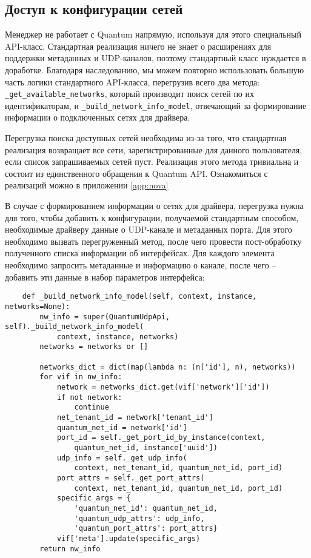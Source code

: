 \subsection{Доступ к конфигурации сетей}

Менеджер не работает с Quantum напрямую, используя для этого специальный
API-класс. Стандартная реализация ничего не знает о расширениях для поддержки метаданных
и UDP-каналов, поэтому стандартный класс нуждается в доработке. Благодаря наследованию,
мы можем повторно использовать большую часть логики стандартного API-класса, перегрузив
всего два метода: \verb`_get_available_networks`,  который производит поиск сетей по их 
идентификаторам, и \verb`_build_network_info_model`, отвечающий за формирование
информации о подключенных сетях для драйвера.

Перегрузка поиска доступных сетей необходима из-за того, что стандартная реализация 
возвращает все сети, зарегистрированные для данного пользователя, если список запрашиваемых
сетей пуст. Реализация этого метода тривиальна и состоит из единственного обращения к 
Quantum API. Ознакомиться с реализаций можно в приложении \ref{app:nova}

В случае с формированием информации о сетях для драйвера, перегрузка нужна для того, чтобы
добавить к конфигурации, получаемой стандартным способом, необходимые драйверу
данные о UDP-канале и метаданных порта. Для этого необходимо вызвать перегруженный метод,
после чего провести пост-обработку полученного списка информации об интерфейсах. 
Для каждого элемента необходимо запросить метаданные и информацию о канале, после чего -- 
добавить эти данные в набор параметров интерфейса:
\begin{lstlisting}
    def _build_network_info_model(self, context, instance, networks=None):
        nw_info = super(QuantumUdpApi, self)._build_network_info_model(
            context, instance, networks)
        networks = networks or []

        networks_dict = dict(map(lambda n: (n['id'], n), networks))
        for vif in nw_info:
            network = networks_dict.get(vif['network']['id'])
            if not network:
                continue
            net_tenant_id = network['tenant_id']
            quantum_net_id = network['id']
            port_id = self._get_port_id_by_instance(context,
                quantum_net_id, instance['uuid'])
            udp_info = self._get_udp_info(
                context, net_tenant_id, quantum_net_id, port_id)
            port_attrs = self._get_port_attrs(
                context, net_tenant_id, quantum_net_id, port_id)
            specific_args = {
                'quantum_net_id': quantum_net_id,
                'quantum_udp_attrs': udp_info,
                'quantum_port_attrs': port_attrs}
            vif['meta'].update(specific_args)
        return nw_info
\end{lstlisting}

